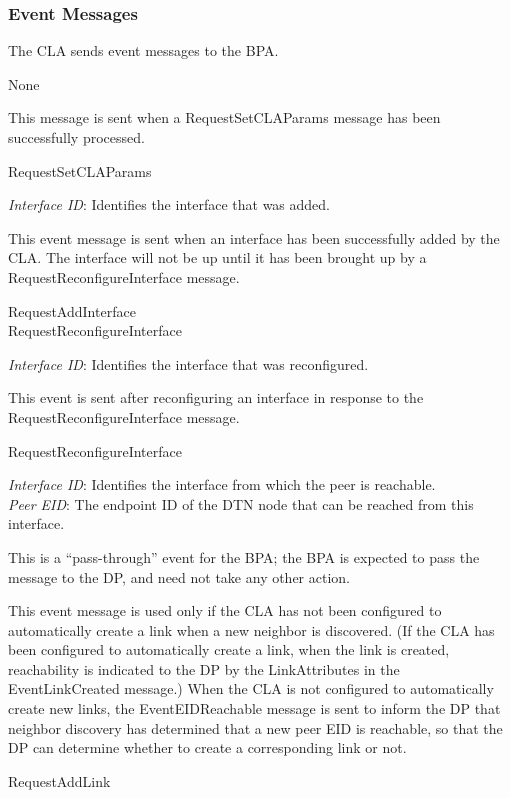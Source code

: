 \subsubsection{Event Messages}

The CLA sends event messages to the BPA.\\[1em]

{
\metP
    None

\metD
    This message is sent when a RequestSetCLAParams message has been
    successfully processed.

\metR
    RequestSetCLAParams
}

{
\metP
    {\em Interface ID}: Identifies the interface that was added.

\metD
    This event message is sent when an interface has been successfully added
    by the CLA. The interface will not be up until it has been brought up
    by a RequestReconfigureInterface message.

\metR
    RequestAddInterface\\
    RequestReconfigureInterface
}

{
\metP
    {\em Interface ID}: Identifies the interface that was reconfigured.

\metD
    This event is sent after reconfiguring an interface in response to
    the RequestReconfigureInterface message.

\metR
    RequestReconfigureInterface
}

{
\metP
    {\em Interface ID}: Identifies the interface from which the peer is
    reachable.\\
    {\em Peer EID}: The endpoint ID of the DTN node that can be reached from
    this interface.

\metD
    This is a ``pass-through'' event for the BPA; the BPA is expected to
    pass the message to the DP, and need not take any other action.

    This event message is used only if the CLA has not been configured to
    automatically create a link when a new neighbor is discovered. (If the CLA
    has been configured to automatically create a link, when the link is
    created, reachability is indicated to the DP by the LinkAttributes in the
    EventLinkCreated message.)
    When the CLA is not configured to automatically create
    new links, the EventEIDReachable message is sent to inform the DP that
    neighbor discovery has determined that a new peer EID is reachable, so that
    the DP can determine whether to create a corresponding link or not.

\metR
    RequestAddLink
}

